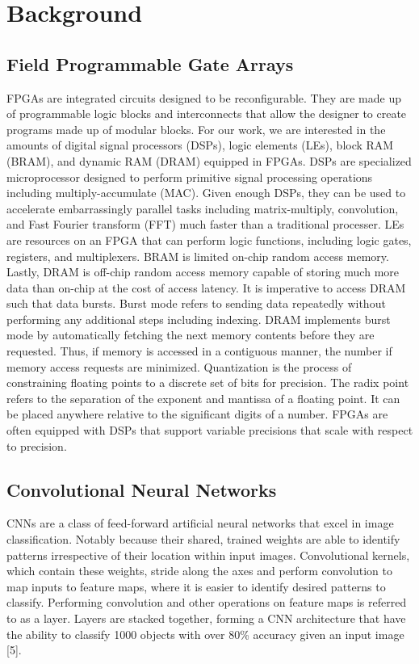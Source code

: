 \chapter{Background}
\section{Field Programmable Gate Arrays}
FPGAs are integrated circuits designed to be reconfigurable. They are made up of programmable logic blocks and interconnects that allow the designer to create programs made up of modular blocks. For our work, we are interested in the amounts of digital signal processors (DSPs), logic elements (LEs), block RAM (BRAM), and dynamic RAM (DRAM) equipped in FPGAs. DSPs are specialized microprocessor designed to perform primitive signal processing operations including multiply-accumulate (MAC). Given enough DSPs, they can be used to accelerate embarrassingly parallel tasks including matrix-multiply, convolution, and Fast Fourier transform (FFT) much faster than a traditional processer. LEs are resources on an FPGA that can perform logic functions, including logic gates, registers, and multiplexers. BRAM is limited on-chip random access memory. Lastly, DRAM is off-chip random access memory capable of storing much more data than on-chip at the cost of access latency. It is imperative to access DRAM such that data bursts. Burst mode refers to sending data repeatedly without performing any additional steps including indexing. DRAM implements burst mode by automatically fetching the next memory contents before they are requested. Thus, if memory is accessed in a contiguous manner, the number if memory access requests are minimized. Quantization is the process of constraining floating points to a discrete set of bits for precision. The radix point refers to the separation of the exponent and mantissa of a floating point. It can be placed anywhere relative to the significant digits of a number. FPGAs are often equipped with DSPs that support variable precisions that scale with respect to precision.

\section{Convolutional Neural Networks}
CNNs are a class of feed-forward artificial neural networks that excel in image classification. Notably because their shared, trained weights are able to identify patterns irrespective of their location within input images. Convolutional kernels, which contain these weights, stride along the axes and perform convolution to map inputs to feature maps, where it is easier to identify desired patterns to classify. Performing convolution and other operations on feature maps is referred to as a layer. Layers are stacked together, forming a CNN architecture that have the ability to classify 1000 objects with over 80\% accuracy given an input image [5].


